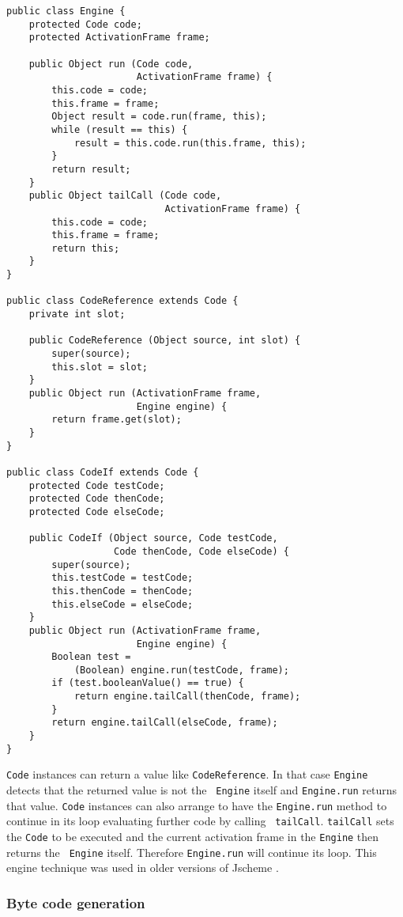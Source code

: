 \documentclass{acm-final/sig-alternate-modified}
\begin{document}
\small
\begin{verbatim}
public class Engine {
    protected Code code;
    protected ActivationFrame frame;

    public Object run (Code code,
                       ActivationFrame frame) {
        this.code = code;
        this.frame = frame;
        Object result = code.run(frame, this);
        while (result == this) {
            result = this.code.run(this.frame, this);
        }
        return result;
    }
    public Object tailCall (Code code,
                            ActivationFrame frame) {
        this.code = code;
        this.frame = frame;
        return this;
    }
}

public class CodeReference extends Code {
    private int slot;

    public CodeReference (Object source, int slot) {
        super(source);
        this.slot = slot;
    }
    public Object run (ActivationFrame frame,
                       Engine engine) {
        return frame.get(slot);
    }
}

public class CodeIf extends Code {
    protected Code testCode;
    protected Code thenCode;
    protected Code elseCode;

    public CodeIf (Object source, Code testCode,
                   Code thenCode, Code elseCode) {
        super(source);
        this.testCode = testCode;
        this.thenCode = thenCode;
        this.elseCode = elseCode;
    }
    public Object run (ActivationFrame frame,
                       Engine engine) {
        Boolean test = 
            (Boolean) engine.run(testCode, frame);
        if (test.booleanValue() == true) {
            return engine.tailCall(thenCode, frame);
        }
        return engine.tailCall(elseCode, frame);
    }
}
\end{verbatim}
\normalsize

{\tt Code} instances can return a value like {\tt CodeReference}.  In
that case {\tt Engine} detects that the returned value is not the {\tt
Engine} itself and {\tt Engine.run} returns that value.  {\tt Code}
instances can also arrange to have the {\tt Engine.run} method to
continue in its loop evaluating further code by calling {\tt
tailCall}.  {\tt tailCall} sets the {\tt Code} to be executed and the
current activation frame in the {\tt Engine} then returns the {\tt
Engine} itself.  Therefore {\tt Engine.run} will continue its loop.
This engine technique was used in older versions of Jscheme
\cite{JschemeEngine}.

\subsubsection{Byte code generation}
\end{document}
